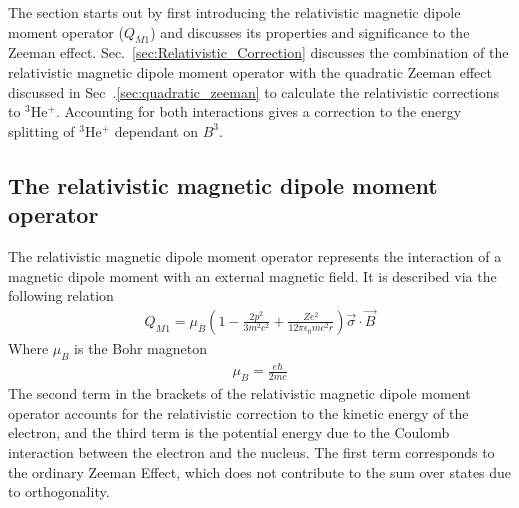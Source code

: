         The section starts out by first introducing the relativistic magnetic dipole moment operator ($Q_{M1}$) and discusses its properties and significance to the Zeeman effect. Sec.~\ref{sec:Relativistic_Correction} discusses the combination of the relativistic magnetic dipole moment operator with the quadratic Zeeman effect discussed in Sec~.\ref{sec:quadratic_zeeman} to calculate the relativistic corrections to $^3$He$^+$. Accounting for both interactions gives a correction to the energy splitting of $^3$He$^+$ dependant on $B^3$.

        \subsection{The relativistic magnetic dipole moment operator}\label{sec:magnetic_dipole_operator}
            The relativistic magnetic dipole moment operator represents the interaction of a magnetic dipole moment with an external magnetic field. It is described via the following relation
            \begin{align}
                Q_{M1} = \mu_B \left( 1 - \frac{2p^2}{3m^2 c^2} + \frac{Ze^2}{12\pi \epsilon_0 mc^2r} \right) \vec{\sigma} \cdot \vec{B}
            \end{align}
            \noindent Where $\mu_B$ is the Bohr magneton
            \begin{align}
                \mu_B = \frac{e \hbar}{2mc}
            \end{align}
            \noindent The second term in the brackets of the relativistic magnetic dipole moment operator accounts for the relativistic correction to the kinetic energy of the electron, and the third term is the potential energy due to the Coulomb interaction between the electron and the nucleus. The first term corresponds to the ordinary Zeeman Effect, which does not contribute to the sum over states due to orthogonality.\\

